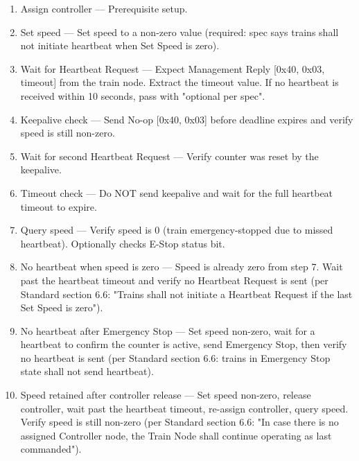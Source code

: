 \begin{enumerate}

\item Assign controller — Prerequisite setup.

\item Set speed — Set speed to a non-zero value (required: spec says trains
   shall not initiate heartbeat when Set Speed is zero).

\item Wait for Heartbeat Request — Expect Management Reply [0x40, 0x03,
   timeout] from the train node.  Extract the timeout value.  If no
   heartbeat is received within 10 seconds, pass with "optional per spec".

\item Keepalive check — Send No-op [0x40, 0x03] before deadline expires
   and verify speed is still non-zero.

\item Wait for second Heartbeat Request — Verify counter was reset by
   the keepalive.

\item Timeout check — Do NOT send keepalive and wait for the full heartbeat
   timeout to expire.

\item Query speed — Verify speed is 0 (train emergency-stopped due to
   missed heartbeat).  Optionally checks E-Stop status bit.

\item No heartbeat when speed is zero — Speed is already zero from step 7.
   Wait past the heartbeat timeout and verify no Heartbeat Request is sent
   (per Standard section 6.6: "Trains shall not initiate a Heartbeat Request
   if the last Set Speed is zero").

\item No heartbeat after Emergency Stop — Set speed non-zero, wait for a
   heartbeat to confirm the counter is active, send Emergency Stop, then
   verify no heartbeat is sent (per Standard section 6.6: trains in Emergency
   Stop state shall not send heartbeat).

\item Speed retained after controller release — Set speed non-zero,
    release controller, wait past the heartbeat timeout, re-assign
    controller, query speed.  Verify speed is still non-zero (per
    Standard section 6.6: "In case there is no assigned Controller node,
    the Train Node shall continue operating as last commanded").

\end{enumerate}

